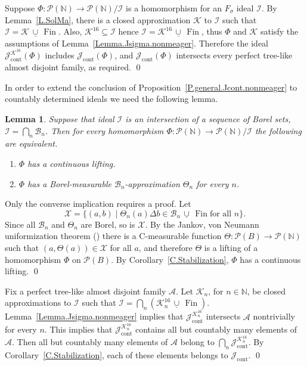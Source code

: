 \documentclass{amsart}
\makeatletter
\def\p{{\mathcal P}}              %
\def\N{\mathbb N}                        %
\def\Fin{{\rm Fin}}   %
\def\text{\mbox}
\newtheorem{lemma}[proposition]{Lemma}
\theoremstyle{definition}
\theoremstyle{remark}
\newcommand{\ucup}{\,\underline{\cup}\,}
\def\Fin{\operatorname{Fin}}
\DeclareMathOperator{\Ccont}{cont}
\newcommand{\Jcont}{\cJ_{\Ccont}}
\newcommand{\cK}{{\mathcal K}}
\renewcommand{\proofname}{Proof}
\renewenvironment{proof}[1][\proofname]{\par
\let\oldqedsymbol\qedsymbol             %
  \normalfont
  \topsep6\p@\@plus6\p@ \trivlist
  \item[\hskip\labelsep\hskip\parindent\scshape
    #1\@addpunct{.}]\ignorespaces
}{%
  \qed\endtrivlist
\global\let\qedsymbol\oldqedsymbol      %
}
\newcommand{\cP}{\mathcal P}
\newcommand{\bbN}{\mathbb N}
\newcommand{\cI}{{\mathcal I}} %
\newcommand{\cJ}{{\mathcal J}} %
\newcommand{\cA}{\mathcal A}
\newcommand{\cX}{\mathcal X}
\newcommand{\cB}{\mathcal B}
\numberwithin{claim}{subsection}
\makeatother
\begin{document}

\begin{proof}[Proof of Proposition~\ref{P.general.Jcont.nonmeager} for $F_\sigma$ ideals]
	Suppose $\Phi\colon \cP(\bbN)\to \cP(\bbN)/\cI$ is a homomorphism for an $F_\sigma$ ideal $\cI$. 
By Lemma~\ref{L.SolMa}, there is a closed approximation  $\cK$ to $\cI$ such that $\cI=\cK\ucup \Fin$. Also, $\cK^{16}\subseteq \cI$ hence $\cI=\cK^{16}\ucup \Fin$, thus  $\Phi$ and $\cK$ satisfy the assumptions of  Lemma~\ref{Lemma.Jsigma.nonmeager}.  Therefore the ideal $\Jcont^{\cK^{16}}(\Phi)$ includes $\Jcont(\Phi)$, and $\Jcont(\Phi)$ intersects every perfect  tree-like almost disjoint family, as required. 
\end{proof}

In order to extend the conclusion of Proposition~\ref{P.general.Jcont.nonmeager}  to countably determined ideals we need the following lemma. 


\begin{lemma}\label{L.countable-approximation-lifting}
	Suppose that ideal $\cI$ is an intersection of a sequence of Borel sets, $\cI=\bigcap_n \cB_n$.  Then for every homomorphism $\Phi\colon \cP(\bbN)\to \cP(\bbN)/\cI$ the following are equivalent. 
	\begin{enumerate}
		\item $\Phi$ has a continuous lifting. 
		\item $\Phi$ has a Borel-measurable $\cB_n$-approximation $\Theta_n$ for every $n$. 
	\end{enumerate}
\end{lemma}

\begin{proof}Only the converse implication requires a proof. 
	Let 
	\[
	\cX=\{(a,b)\mid \Theta_n(a)\Delta b\in \cB_n\ucup \Fin\text{for all $n$}\}.
	\]
	Since all $\cB_n$ and $\Theta_n$ are Borel, so is $\cX$. By the 
	Jankov, von Neumann uniformization  
	theorem (\cite[18.A]{Ke:Classical})
	there is a
	C-measurable function $\Theta\colon \p(B)\to \p(\N)$ such that 
	$(a,\Theta(a))\in \cX$ for all $a$, and   therefore $\Theta$ is a
	lifting of a 
	homomorphism $\Phi$ on $\p(B)$. 
	By Corollary~\ref{C.Stabilization}, $\Phi$ has a continuous lifting. 
\end{proof}

\begin{proof}[Proof of Proposition~\ref{P.general.Jcont.nonmeager}, the general case] Fix a perfect tree-like almost disjoint family $\cA$.
Let $\cK_n$, for $n\in \bbN$, be closed approximations to $\cI$ such that $\cI=\bigcap_n (\cK_n^{16}\ucup \Fin)$. Lemma~\ref{Lemma.Jsigma.nonmeager} implies that $\Jcont^{\cK_n^{16}}$ intersects $\cA$ nontrivially for every $n$. This implies that $\Jcont^{\cK_n^{16}}$ contains all but countably many elements of $\cA$.   Then all but countably many elements of $\cA$ belong to $\bigcap_n \Jcont^{\cK_n^{16}}$. By Corollary~\ref{C.Stabilization}, each of these elements belongs to $\Jcont$.  
\end{proof}
\end{document}
